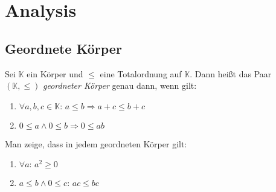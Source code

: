 \documentclass[10pt]{scrbook}
\begin{document}
\chapter{Analysis}

\section{Geordnete Körper}

\begin{Def} Sei $\mathbb{K}$ ein Körper und $\leq$ eine Totalordnung auf $\mathbb{K}$. Dann heißt das Paar $(\mathbb{K}, \leq)$ \emph{geordneter Körper} genau dann, wenn gilt:
\begin{enumerate}
	\item $\forall a, b, c\in \mathbb{K}:\,a\leq b\Rightarrow a+c\leq b+c$
	\item $0\leq a \wedge 0 \leq b \Rightarrow 0\leq a b$
\end{enumerate}
\end{Def}

\begin{Auf}
Man zeige, dass in jedem geordneten Körper gilt:
\begin{enumerate}
	\item $\forall a:\, a^2\geq 0$
	\item $a\leq b \wedge 0\leq c:\, a c\leq b c$
\end{enumerate}
\end{Auf}
\end{document}
